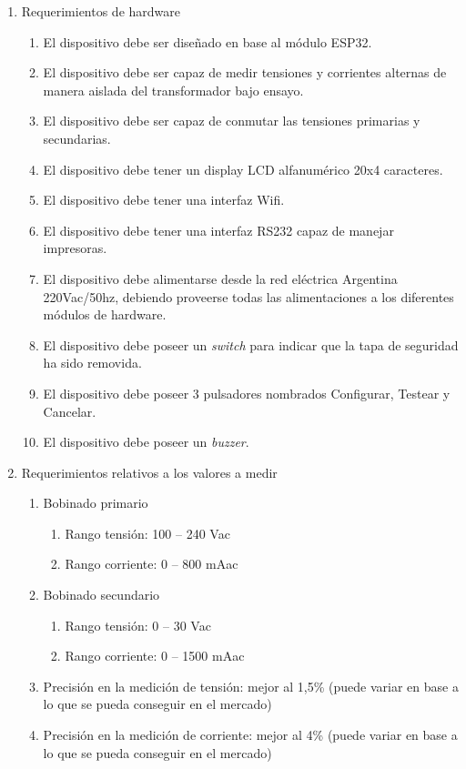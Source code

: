 \documentclass[11pt]{charter}
\begin{document}
\begin{enumerate}
\item Requerimientos de hardware
	\begin{enumerate}
	\item El dispositivo debe ser diseñado en base al módulo ESP32.
	\item El dispositivo debe ser capaz de medir tensiones y corrientes alternas de manera aislada del transformador bajo ensayo.
	\item El dispositivo debe ser capaz de conmutar las tensiones primarias y secundarias.
	\item El dispositivo debe tener un display LCD alfanumérico 20x4 caracteres.
	\item El dispositivo debe tener una interfaz Wifi.
	\item El dispositivo debe tener una interfaz RS232 capaz de manejar impresoras.
	\item El dispositivo debe alimentarse desde la red eléctrica Argentina 220Vac/50hz, debiendo proveerse todas las alimentaciones a los diferentes módulos de hardware.
	\item El dispositivo debe poseer un \textit{switch} para indicar que la tapa de seguridad ha sido removida.
	\item El dispositivo debe poseer 3 pulsadores nombrados Configurar, Testear y Cancelar.
	\item El dispositivo debe poseer un \textit{buzzer}.
	\end{enumerate}
\item Requerimientos relativos a los valores a medir
	\begin{enumerate}
	\item Bobinado primario
		\begin{enumerate}
		\item Rango tensión: 100 – 240 Vac
		\item Rango corriente: 0 – 800 mAac
		\end{enumerate}
	\item Bobinado secundario
		\begin{enumerate}
		\item Rango tensión: 0 – 30 Vac
		\item Rango corriente: 0 – 1500 mAac
		\end{enumerate}
	\item Precisión en la medición de tensión: mejor al 1,5\% (puede variar en base a lo que se pueda conseguir en el mercado)
	\item Precisión en la medición de corriente: mejor al 4\% (puede variar en base a lo que se pueda conseguir en el mercado)

\end{enumerate}
\end{enumerate}
\end{document}
